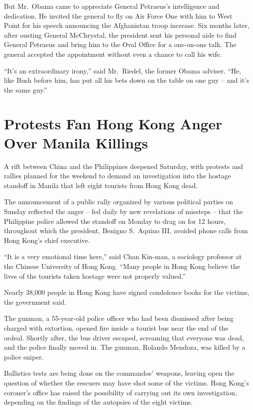 ﻿\documentclass[12pt]{article}
\begin{document}
But Mr.~Obama came to appreciate General Petraeus's intelligence and dedication. He invited the
general to fly on Air Force One with him to West Point for his speech announcing the Afghanistan
troop increase. Six months later, after ousting General McChrystal, the president sent his personal
aide to find General Petraeus and bring him to the Oval Office for a one-on-one talk. The general
accepted the appointment without even a chance to call his wife.

``It's an extraordinary irony,'' said Mr.~Riedel, the former Obama adviser. ``He, like Bush before
him, has put all his bets down on the table on one guy -- and it's the same guy.''

\pagebreak
\section{Protests Fan Hong Kong Anger Over Manila Killings}

\lettrine{A}{} rift between China and the Philippines deepened Saturday,
with protests and rallies planned for the weekend to demand an investigation into the hostage
standoff in Manila that left eight tourists from Hong Kong dead.

The announcement of a public rally organized by various political parties on Sunday reflected the
anger -- fed daily by new revelations of missteps -- that the Philippine police allowed the standoff
on Monday to drag on for 12 hours, throughout which the president, Benigno S.~Aquino III, avoided
phone calls from Hong Kong's chief executive.

``It is a very emotional time here,'' said Chan Kin-man, a sociology professor at the Chinese
University of Hong Kong. ``Many people in Hong Kong believe the lives of the tourists taken hostage
were not properly valued.''

Nearly 38,000 people in Hong Kong have signed condolence books for the victims, the government said.

The gunman, a 55-year-old police officer who had been dismissed after being charged with extortion,
opened fire inside a tourist bus near the end of the ordeal. Shortly after, the bus driver escaped,
screaming that everyone was dead, and the police finally moved in. The gunman, Rolando Mendoza, was
killed by a police sniper.

Ballistics tests are being done on the commandos' weapons, leaving open the question of whether the
rescuers may have shot some of the victims. Hong Kong's coroner's office has raised the possibility
of carrying out its own investigation, depending on the findings of the autopsies of the eight
victims.
\end{document}
